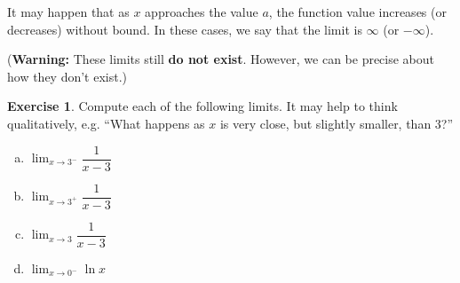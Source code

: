 \documentclass[11pt,reqno,final]{amsart}
\numberwithin{equation}{section}
\numberwithin{figure}{section}
\theoremstyle{definition} %
\newtheorem{exercise}[question]{Exercise}
\begin{document}
It may happen that as $x$ approaches the value $a$, the function value increases (or decreases) without bound.
In these cases, we say that the limit is $\infty$ (or $-\infty$).

(\textbf{Warning:} These limits still \textbf{do not exist}. However, we can be precise about how they don't exist.)

\begin{exercise}
        Compute each of the following limits. It may help to think qualitatively, e.g. ``What happens as $x$ is very close, but slightly smaller, than $3$?''\\
        \begin{enumerate}[(a)]\itemsep+35pt
        \item $\displaystyle\lim_{x \to 3^-} \dfrac{1}{x-3}$
        \item $\displaystyle\lim_{x \to 3^+} \dfrac{1}{x-3}$
        \item $\displaystyle\lim_{x \to 3} \dfrac{1}{x-3}$
        \item $\displaystyle\lim_{x \to 0^-} \ln x$
        \end{enumerate}

       
\end{exercise}
\end{document}
